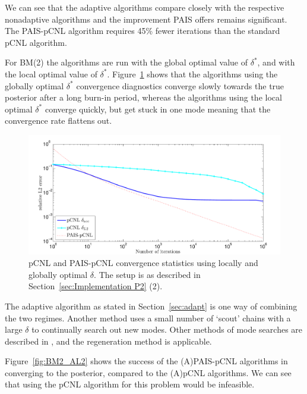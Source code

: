 \documentclass[final]{siamltex}
\begin{document}
We can see that the adaptive algorithms compare closely with the respective nonadaptive algorithms and the improvement PAIS offers remains significant. The PAIS-pCNL algorithm requires 45\% fewer iterations than the standard pCNL algorithm.

For BM(2) the algorithms are run with the global optimal value of $\delta^*$, and with the local optimal value of $\delta^*$. Figure~\ref{fig:BM2_L2} shows that the algorithms using the globally optimal $\delta^*$ convergence diagnostics converge slowly towards the true posterior after a long burn-in period, whereas the algorithms using the local optimal $\delta^*$ converge quickly, but get stuck in one mode meaning that the convergence rate flattens out.

\begin{figure}[h]
\begin{center}
\includegraphics[width=\textwidth]{"figures/BM2_L2"}
\caption{pCNL and PAIS-pCNL convergence statistics using locally and globally optimal $\delta$. The setup is as described in Section~\ref{sec:Implementation P2} (2).}
\label{fig:BM2_L2}
\end{center}
\end{figure}

The adaptive algorithm as stated in Section~\ref{sec:adapt} is one way of combining the two regimes. Another method uses a small number of `scout' chains with a large $\delta$ to continually search out new modes. Other methods of mode searches are described in \cite{lan2013wormhole}, and the regeneration method is applicable\cite{nummelin1984general}.

Figure~\ref{fig:BM2_AL2} shows the success of the (A)PAIS-pCNL algorithms in converging to the posterior, compared to the (A)pCNL algorithms. We can see that using the pCNL algorithm for this problem would be infeasible.
\end{document}
